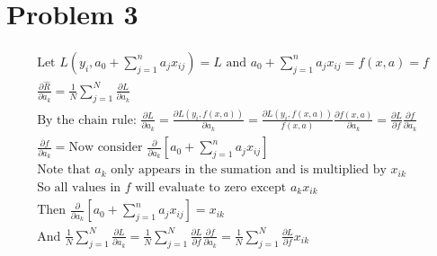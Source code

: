 \documentclass[11pt]{article}
\begin{document}
\begin{center}

\ \\
\end{center}


\section*{Problem 3}

\begin{gather*}
\text{Let } L(y_{i}, a_{0} + \sum_{j = 1}^{n} a_{j}x_{ij}) = L 
\text{ and } a_{0} + \sum_{j = 1}^{n} a_{j}x_{ij} = f(x, a) = f\\
\frac{\partial \hat{R}}{\partial a_{k}} = 
\frac{1}{N} \sum_{j = 1}^{N} \frac{\partial L}{\partial a_{k}}\\
\text{By the chain rule: } 
\frac{\partial L}{\partial a_{k}} = 
\frac{\partial L(y_{i}, f(x, a))}{\partial a_{k}} = 
\frac{\partial L(y_{i}, f(x, a))}{f(x, a)} 
\frac{\partial f(x, a)}{\partial a_{k}} = 
\frac{\partial L}{\partial f} \frac{\partial f}{\partial a_{k}}\\
\frac{\partial f}{\partial a_{k}} = 
\text{Now consider } 
\frac{\partial}{\partial a_{k}} [a_{0} + \sum_{j = 1}^{n} a_{j}x_{ij}]\\
\text{Note that } a_{k} 
\text{ only appears in the sumation and is multiplied by } x_{ik}\\
\text{So all values in } f 
\text{ will evaluate to zero except } a_{k}x_{ik}\\
\text{Then } 
\frac{\partial}{\partial a_{k}} [a_{0} + \sum_{j = 1}^{n} a_{j}x_{ij}] = x_{ik}\\
\text{And } 
\frac{1}{N} \sum_{j = 1}^{N} \frac{\partial L}{\partial a_{k}} = 
\frac{1}{N} \sum_{j = 1}^{N} \frac{\partial L}{\partial f} 
\frac{\partial f}{\partial a_{k}} = 
\frac{1}{N} \sum_{j = 1}^{N} \frac{\partial L}{\partial f} x_{ik}
\end{gather*}
\end{document}
